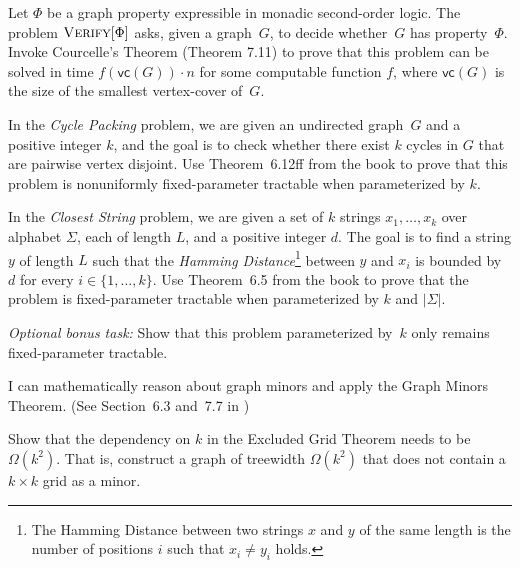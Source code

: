 \documentclass[english]{uebung_cs}
\begin{document}
\begin{exercise}
  Let $\Phi$ be a graph property expressible in monadic second-order logic. The problem $\textsc{Verify}[\Phi]$ asks, given a graph~$G$, to decide whether~$G$ has property~$\Phi$.
  Invoke Courcelle's Theorem (Theorem 7.11) to prove that this problem can be solved in time $f(\mathsf{vc}(G))\cdot n$ for some computable function $f$, where $\mathsf{vc}(G)$ is the size of the smallest vertex-cover of~$G$.
\end{exercise}

\begin{exercise}
  In the \emph{Cycle Packing} problem, we are given an undirected graph~$G$ and a positive integer $k$, and the goal is to check whether there exist $k$ cycles in $G$ that are pairwise vertex disjoint. Use Theorem~6.12ff from the book to prove that this problem is nonuniformly fixed-parameter tractable when parameterized by $k$.
\end{exercise}

\begin{exercise}
  In the \emph{Closest String} problem, we are given a set of $k$ strings $x_1,\dots,x_k$ over alphabet $\Sigma$, each of length $L$, and a positive integer $d$. The goal is to find a string $y$ of length $L$ such that the \emph{Hamming Distance}\footnote{The Hamming Distance between two strings $x$ and $y$ of the same length is the number of positions $i$ such that $x_i \neq y_i$ holds.} between $y$ and $x_i$ is bounded by $d$ for every $i\in \{1,\dots,k\}$. Use Theorem~6.5 from the book to prove that the problem is fixed-parameter tractable when parameterized by $k$ and $|\Sigma|$.

  \noindent\emph{Optional bonus task:} Show that this problem parameterized by~$k$ only remains fixed-parameter tractable.
\end{exercise}

\newpage
\begin{skill}
  I can mathematically reason about graph minors and apply the Graph Minors Theorem. \normalfont (See Section~6.3 and~7.7 in \cygan{})
\end{skill}

\begin{exercise}
  Show that the dependency on $k$ in the Excluded Grid Theorem needs to be $\Omega(k^2)$. That is, construct a graph of treewidth $\Omega(k^2)$ that does not contain a $k \times k$ grid as a minor.
\end{exercise}
\end{document}
